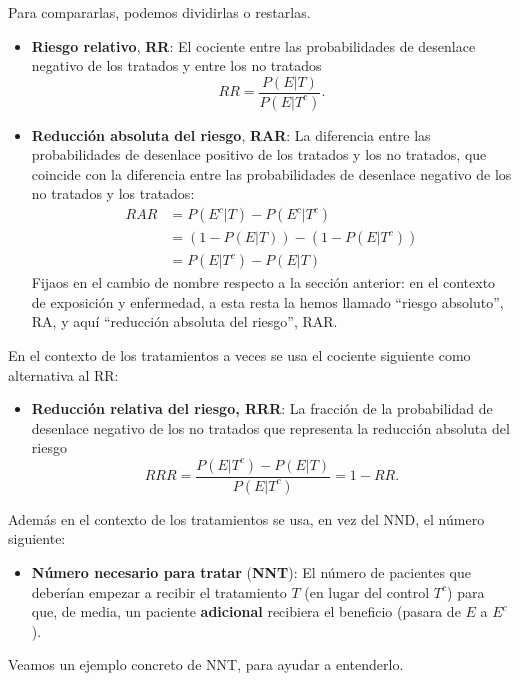 \documentclass[
]{book}
\providecommand{\tightlist}{%
  \setlength{\itemsep}{0pt}\setlength{\parskip}{0pt}}
\theoremstyle{definition}
\theoremstyle{definition}
\theoremstyle{definition}
\theoremstyle{definition}
\theoremstyle{remark}
\begin{document}
Para compararlas, podemos dividirlas o restarlas.

\begin{itemize}
\item
  \textbf{Riesgo relativo}, \textbf{RR}: El cociente entre las probabilidades de desenlace negativo de los tratados y entre los no tratados
  \[
  RR=\dfrac{P(E|T)}{P(E|T^c)}.
  \]
\item
  \textbf{Reducción absoluta del riesgo}, \textbf{RAR}: La diferencia entre las probabilidades de desenlace positivo de los tratados y los no tratados, que coincide con la diferencia entre las probabilidades de desenlace negativo de los no tratados y los tratados:\\
  \[
  \begin{array}{rl}
  RAR\!\!\!\! & =P(E^c|T)-P(E^c|T^c)\\
  & =(1-P(E|T))-(1-P(E|T^c))\\
  & =P(E|T^c)-P(E|T)
  \end{array}
  \]
  Fijaos en el cambio de nombre respecto a la sección anterior: en el contexto de exposición y enfermedad, a esta resta la hemos llamado ``riesgo absoluto'', RA, y aquí ``reducción absoluta del riesgo'', RAR.
\end{itemize}

En el contexto de los tratamientos a veces se usa el cociente siguiente como alternativa al RR:

\begin{itemize}
\tightlist
\item
  \textbf{Reducción relativa del riesgo, RRR}: La fracción de la probabilidad de desenlace negativo de los no tratados que representa la reducción absoluta del riesgo
  \[
  RRR=\dfrac{P(E|T^c)-P(E|T)}{P(E|T^c)}=1-RR.
  \]
\end{itemize}

Además en el contexto de los tratamientos se usa, en vez del NND, el número siguiente:

\begin{itemize}
\tightlist
\item
  \textbf{Número necesario para tratar} (\textbf{NNT}): El número de pacientes que deberían empezar a recibir el tratamiento \(T\) (en lugar del control \(T^c\)) para que, de media, un paciente \textbf{adicional} recibiera el beneficio (pasara de \(E\) a \(E^c\)).
\end{itemize}

Veamos un ejemplo concreto de NNT, para ayudar a entenderlo.
\end{document}
